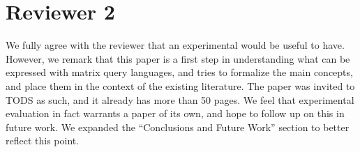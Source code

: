 \section*{Reviewer 2}
\label{sec:reviewer-2}

\bigskip

\begin{comment}
(\ldots) However, being TODS about Database \emph{systems} and thus usually more oriented towards applied results, I wonder whether an additional (even preliminary) experimental evaluation/implementation of the language would have been needed (I will not fight to have that, though).
\end{comment}
\answer We fully agree with the reviewer that an experimental would be useful to have. However, we remark that this paper is a first step in understanding what can be expressed with matrix query languages, and tries to formalize the main concepts, and place them in the context of the existing literature. The paper was invited to TODS as such, and it already has more than 50 pages.  We feel that experimental evaluation in fact warrants a paper of its own, and hope to follow up on this in future work. We expanded the ``Conclusions and Future Work'' section to better reflect this point.

\bigskip


\begin{comment}
	On the negative side, I believe that the paper is trying, in different places to oversell a bit its results. In particular, the paper makes a big deal in explaining that families of circuits are the de-facto representative logic of linear algebra, but you do not clarify if this is the case under the assumption that, e.g., the depth is bounded. Since your equivalence results are about families of bounded depth/degree, you should properly discuss to what extent, families of circuits of this kind are able to express linear algebra constructs.
\end{comment}
\answer \TODO
{}


\bigskip

